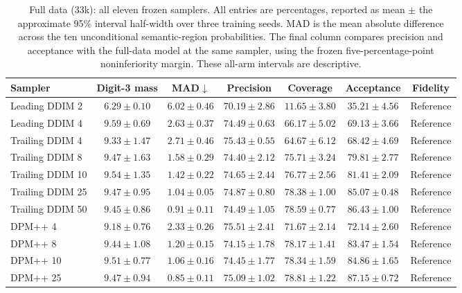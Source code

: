 \begin{table}[t]
\centering\footnotesize
\setlength{\tabcolsep}{3.5pt}
\caption{Full data (33k): all eleven frozen samplers. All entries are percentages, reported as mean $\pm$ the approximate 95\% interval half-width over three training seeds. MAD is the mean absolute difference across the ten unconditional semantic-region probabilities. The final column compares precision and acceptance with the full-data model at the same sampler, using the frozen five-percentage-point noninferiority margin. These all-arm intervals are descriptive.}
\label{tab:mnist_all_full_data}
\begin{tabular}{lcccccc}
\toprule
Sampler & Digit-3 mass & MAD$\downarrow$ & Precision & Coverage & Acceptance & Fidelity \\
\midrule
Leading DDIM 2 & $6.29\pm0.10$ & $6.02\pm0.46$ & $70.19\pm2.86$ & $11.65\pm3.80$ & $35.21\pm4.56$ & Reference \\
Leading DDIM 4 & $9.59\pm0.69$ & $2.63\pm0.37$ & $74.49\pm0.63$ & $66.17\pm5.02$ & $69.13\pm3.66$ & Reference \\
Trailing DDIM 4 & $9.33\pm1.47$ & $2.71\pm0.46$ & $75.43\pm0.55$ & $64.67\pm6.12$ & $68.42\pm4.69$ & Reference \\
Trailing DDIM 8 & $9.47\pm1.63$ & $1.58\pm0.29$ & $74.40\pm2.12$ & $75.71\pm3.24$ & $79.81\pm2.77$ & Reference \\
Trailing DDIM 10 & $9.54\pm1.35$ & $1.42\pm0.22$ & $74.65\pm2.44$ & $76.77\pm2.56$ & $81.41\pm2.09$ & Reference \\
Trailing DDIM 25 & $9.47\pm0.95$ & $1.04\pm0.05$ & $74.87\pm0.80$ & $78.38\pm1.00$ & $85.07\pm0.48$ & Reference \\
Trailing DDIM 50 & $9.45\pm0.86$ & $0.91\pm0.11$ & $74.49\pm1.05$ & $78.59\pm0.77$ & $86.43\pm1.00$ & Reference \\
DPM++ 4 & $9.18\pm0.76$ & $2.33\pm0.26$ & $75.51\pm2.41$ & $71.67\pm2.14$ & $72.14\pm2.60$ & Reference \\
DPM++ 8 & $9.44\pm1.08$ & $1.20\pm0.15$ & $74.15\pm1.78$ & $78.17\pm1.41$ & $83.47\pm1.54$ & Reference \\
DPM++ 10 & $9.51\pm0.77$ & $1.06\pm0.16$ & $74.45\pm1.77$ & $78.34\pm1.59$ & $84.86\pm1.65$ & Reference \\
DPM++ 25 & $9.47\pm0.94$ & $0.85\pm0.11$ & $75.09\pm1.02$ & $78.81\pm1.22$ & $87.15\pm0.72$ & Reference \\
\bottomrule
\end{tabular}
\end{table}
